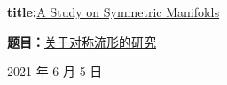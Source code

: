 \begin{center}
    \vspace*{10pt}

    {\huge {}}
    
    \vspace{20pt}
    
    \scalebox{1.5}{\huge\sffamily 综\ 合\ 论\ 文\ 训\ 练}
    
    \vspace{80pt}
    
    \begin{spacing}{2.0}
    \textbf{\Large{title:}}{\Huge\sffamily \underline {A Study on Symmetric Manifolds} 
    }
    \end{spacing}
    
    \textbf{\Large{题目：}}{\Huge\sffamily \underline {关于对称流形的研究}
    }
    
    \vspace{140pt}
    
    {\Large \parsep=12pt
        \quad
        
        \quad
        
        \quad
        
        \quad
        
    }
    
    \vspace{40pt}
        
    2021 年 6 月 5 日
\end{center}
